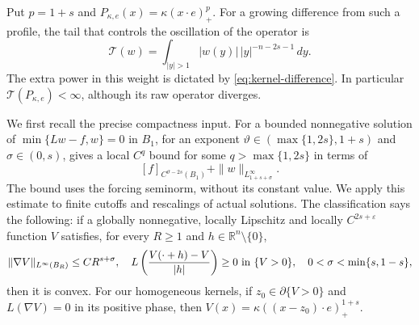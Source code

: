\documentclass[11pt]{article}
\numberwithin{equation}{section}
\newcommand{\R}{\mathbb R}
\newcommand{\T}{\mathcal T}
\begin{document}
Put $p=1+s$ and $P_{\kappa,e}(x)=\kappa(x\cdot e)_+^p$. For a growing
difference from such a profile, the tail that controls the oscillation of
the operator is
\begin{equation}\label{eq:tail-definition}
             \T(w)=\int_{|y|>1}|w(y)|\,|y|^{-n-2s-1}\,dy.
\end{equation}
The extra power in this weight is dictated by
\eqref{eq:kernel-difference}. In particular $\T(P_{\kappa,e})<\infty$,
although its raw operator diverges.

We first recall the precise compactness input. For a bounded nonnegative
solution of $\min\{Lw-f,w\}=0$ in $B_1$, for an exponent
$\vartheta\in(\max\{1,2s\},1+s)$ and $\sigma\in(0,s)$,
\cite[Lemma 6.5]{RTW} gives a local $C^q$ bound for some
$q>\max\{1,2s\}$ in terms of
\begin{equation}\label{eq:rough-compactness}
          [f]_{C^{\vartheta-2s}(B_1)}+
                           \|w\|_{L^\infty_{1+s+\sigma}}.
\end{equation}
The bound uses the forcing seminorm, without its constant value. We apply
this estimate to finite cutoffs and rescalings of actual solutions. The
classification \cite[Theorem 1.5]{RTW} says the following: if a globally
nonnegative, locally Lipschitz and locally $C^{2s+\varepsilon}$ function
$V$ satisfies, for every $R\geq1$ and $h\in\R^n\setminus\{0\}$,
\begin{equation}\label{eq:classification-hypotheses}
 \|\nabla V\|_{L^\infty(B_R)}\leq CR^{s+\sigma},\quad
 L\left(\frac{V(\cdot+h)-V}{|h|}\right)\geq0\ \hbox{in }\{V>0\},
 \quad 0<\sigma<\min\{s,1-s\},
\end{equation}
then it is convex. For our homogeneous kernels, if
$z_0\in\partial\{V>0\}$ and $L(\nabla V)=0$ in its positive phase, then
$V(x)=\kappa((x-z_0)\cdot e)_+^{1+s}$.
\end{document}
